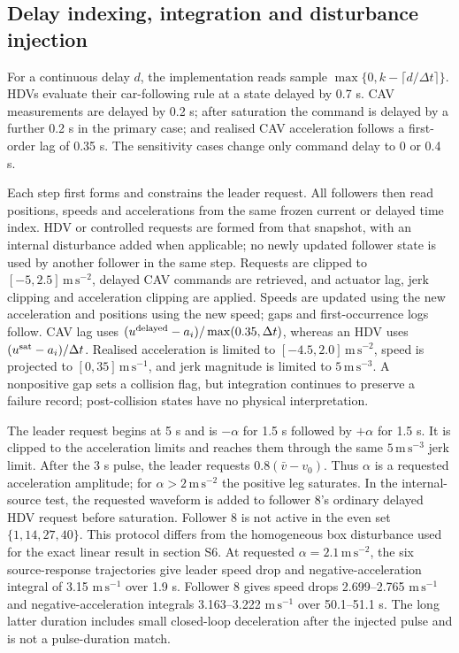 \documentclass[11pt]{article}
\begin{document}
\subsection*{Delay indexing, integration and disturbance injection}
For a continuous delay $d$, the implementation reads sample $\max\{0,k-\lceil d/\Delta t\rceil\}$. HDVs evaluate their car-following rule at a state delayed by 0.7 s. CAV measurements are delayed by 0.2 s; after saturation the command is delayed by a further 0.2 s in the primary case; and realised CAV acceleration follows a first-order lag of 0.35 s. The sensitivity cases change only command delay to 0 or 0.4 s.

Each step first forms and constrains the leader request. All followers then read positions, speeds and accelerations from the same frozen current or delayed time index. HDV or controlled requests are formed from that snapshot, with an internal disturbance added when applicable; no newly updated follower state is used by another follower in the same step. Requests are clipped to $[-5,2.5]\,\mathrm{m\,s^{-2}}$, delayed CAV commands are retrieved, and actuator lag, jerk clipping and acceleration clipping are applied. Speeds are updated using the new acceleration and positions using the new speed; gaps and first-occurrence logs follow. CAV lag uses $(u^{\rm delayed}-a_i)/\max(0.35,\Delta t)$, whereas an HDV uses $(u^{\rm sat}-a_i)/\Delta t$. Realised acceleration is limited to $[-4.5,2.0]\,\mathrm{m\,s^{-2}}$, speed is projected to $[0,35]\,\mathrm{m\,s^{-1}}$, and jerk magnitude is limited to $5\,\mathrm{m\,s^{-3}}$. A nonpositive gap sets a collision flag, but integration continues to preserve a failure record; post-collision states have no physical interpretation.

The leader request begins at 5 s and is $-\alpha$ for 1.5 s followed by $+\alpha$ for 1.5 s. It is clipped to the acceleration limits and reaches them through the same $5\,\mathrm{m\,s^{-3}}$ jerk limit. After the 3 s pulse, the leader requests $0.8(\bar v-v_0)$. Thus $\alpha$ is a requested acceleration amplitude; for $\alpha>2\,\mathrm{m\,s^{-2}}$ the positive leg saturates. In the internal-source test, the requested waveform is added to follower 8's ordinary delayed HDV request before saturation. Follower 8 is not active in the even set $\{1,14,27,40\}$. This protocol differs from the homogeneous box disturbance used for the exact linear result in section S6. At requested $\alpha=2.1\,\mathrm{m\,s^{-2}}$, the six source-response trajectories give leader speed drop and negative-acceleration integral of 3.15 $\mathrm{m\,s^{-1}}$ over 1.9 s. Follower 8 gives speed drops 2.699--2.765 $\mathrm{m\,s^{-1}}$ and negative-acceleration integrals 3.163--3.222 $\mathrm{m\,s^{-1}}$ over 50.1--51.1 s. The long latter duration includes small closed-loop deceleration after the injected pulse and is not a pulse-duration match.
\end{document}
